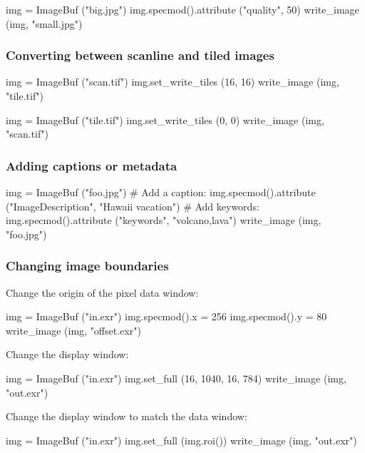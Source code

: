 \begin{code}
    img = ImageBuf ("big.jpg")
    img.specmod().attribute ("quality", 50)
    write_image (img, "small.jpg")
\end{code}


\subsubsection*{Converting between scanline and tiled images}

\begin{code}
    img = ImageBuf ("scan.tif")
    img.set_write_tiles (16, 16)
    write_image (img, "tile.tif")

    img = ImageBuf ("tile.tif")
    img.set_write_tiles (0, 0)
    write_image (img, "scan.tif")
\end{code}


\subsubsection*{Adding captions or metadata}

\begin{code}
    img = ImageBuf ("foo.jpg")
    # Add a caption:
    img.specmod().attribute ("ImageDescription", "Hawaii vacation")
    # Add keywords:
    img.specmod().attribute ("keywords", "volcano,lava")
    write_image (img, "foo.jpg")
\end{code}


\subsubsection*{Changing image boundaries}

\noindent Change the origin of the pixel data window:
\begin{code}
    img = ImageBuf ("in.exr")
    img.specmod().x = 256
    img.specmod().y = 80
    write_image (img, "offset.exr")
\end{code}

\noindent Change the display window:
\begin{code}
    img = ImageBuf ("in.exr")
    img.set_full (16, 1040, 16, 784)
    write_image (img, "out.exr")
\end{code}

\noindent Change the display window to match the data window:
\begin{code}
    img = ImageBuf ("in.exr")
    img.set_full (img.roi())
    write_image (img, "out.exr")
\end{code}

